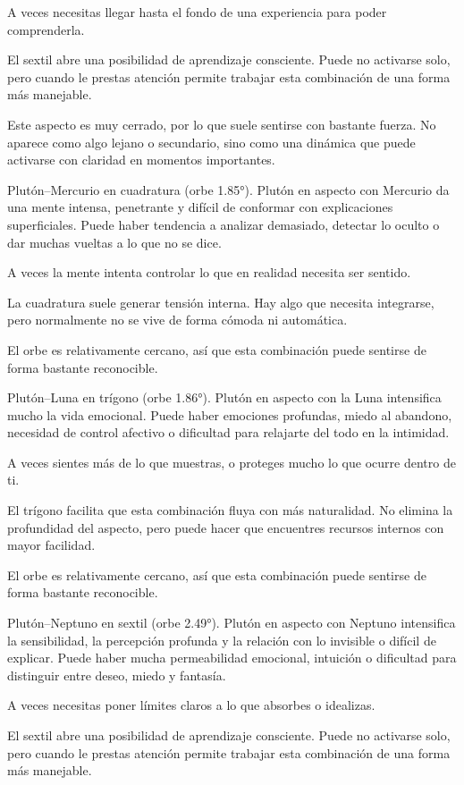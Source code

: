 \documentclass[11pt,a4paper]{article}
\begin{document}
A veces necesitas llegar hasta el fondo de una experiencia para poder comprenderla.

El sextil abre una posibilidad de aprendizaje consciente. Puede no activarse solo, pero cuando le prestas atención permite trabajar esta combinación de una forma más manejable.

Este aspecto es muy cerrado, por lo que suele sentirse con bastante fuerza. No aparece como algo lejano o secundario, sino como una dinámica que puede activarse con claridad en momentos importantes.

Plutón–Mercurio en cuadratura (orbe 1.85°).
Plutón en aspecto con Mercurio da una mente intensa, penetrante y difícil de conformar con explicaciones superficiales. Puede haber tendencia a analizar demasiado, detectar lo oculto o dar muchas vueltas a lo que no se dice.

A veces la mente intenta controlar lo que en realidad necesita ser sentido.

La cuadratura suele generar tensión interna. Hay algo que necesita integrarse, pero normalmente no se vive de forma cómoda ni automática.

El orbe es relativamente cercano, así que esta combinación puede sentirse de forma bastante reconocible.

Plutón–Luna en trígono (orbe 1.86°).
Plutón en aspecto con la Luna intensifica mucho la vida emocional. Puede haber emociones profundas, miedo al abandono, necesidad de control afectivo o dificultad para relajarte del todo en la intimidad.

A veces sientes más de lo que muestras, o proteges mucho lo que ocurre dentro de ti.

El trígono facilita que esta combinación fluya con más naturalidad. No elimina la profundidad del aspecto, pero puede hacer que encuentres recursos internos con mayor facilidad.

El orbe es relativamente cercano, así que esta combinación puede sentirse de forma bastante reconocible.

Plutón–Neptuno en sextil (orbe 2.49°).
Plutón en aspecto con Neptuno intensifica la sensibilidad, la percepción profunda y la relación con lo invisible o difícil de explicar. Puede haber mucha permeabilidad emocional, intuición o dificultad para distinguir entre deseo, miedo y fantasía.

A veces necesitas poner límites claros a lo que absorbes o idealizas.

El sextil abre una posibilidad de aprendizaje consciente. Puede no activarse solo, pero cuando le prestas atención permite trabajar esta combinación de una forma más manejable.
\end{document}
